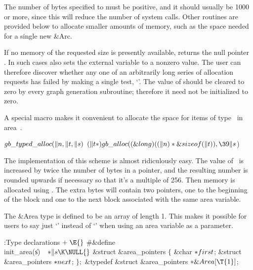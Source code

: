 The number of bytes  specified to  must be positive,
and
it should usually be 1000 or more, since this will reduce the number
of system calls. Other routines are provided below to allocate smaller
amounts of memory, such as the space needed for a single new \&{Arc}.

If no memory of the requested size is presently available, 
returns the null pointer \PB{$\NULL$}. In such cases  also
sets
the external variable  to a nonzero value. The user
can therefore discover whether any one of an arbitrarily long series
of allocation requests has failed by making a single test, `'. The value of  should be cleared
to zero
by every graph generation subroutine; therefore it need not be
initialized to zero.

A special macro  makes it convenient to
allocate
the space for  items of type~ in area~.

\Y\B\4\D$\\{gb\_typed\_alloc}(\|n,\|t,\|s)$ \5
$(\|t*)\\{gb\_alloc}((\&{long})((\|n)*\&{sizeof}(\|t)),\39\|s{}$)\par
\fi

The implementation of this scheme is almost ridiculously easy. The
value of~ is increased by twice the number of bytes in a pointer,
and the resulting number is rounded upwards if necessary so that it's
a multiple of 256. Then memory is allocated using .  The extra
bytes will contain two pointers, one to the beginning of the block and
one to the next block associated with the same area variable.

The \&{Area} type is defined to be an array of length 1. This makes it possible
for users to say just `' instead of `' when using an
area
variable as a parameter.

\Y\B\4:Type declarations\X${}\mathrel+\E{}$\6
\8\#\&{define} \\{init\_area}(\|s)\5${}\hbox{\quad}{*}\|s\K\NULL{}$\6
\&{struct} \&{area\_pointers} ${}\{{}$\1\6
\&{char} ${}{*}\\{first}{}$;\6
\&{struct} \&{area\_pointers} ${}{*}\\{next}{}$;\2\6
${}\};{}$\6
\&{typedef} \&{struct} \&{area\_pointers} ${}{*}\&{Area}[\T{1}]{}$;\par
\fi

